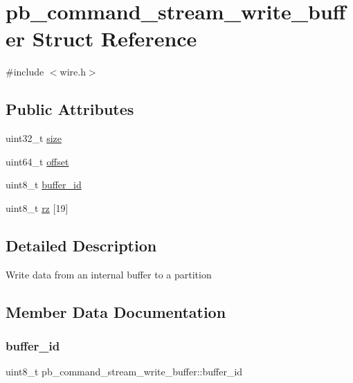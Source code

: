 \hypertarget{structpb__command__stream__write__buffer}{}\section{pb\+\_\+command\+\_\+stream\+\_\+write\+\_\+buffer Struct Reference}
\label{structpb__command__stream__write__buffer}


{\ttfamily \#include $<$wire.\+h$>$}

\subsection*{Public Attributes}
\begin{DoxyCompactItemize}
\item 
uint32\+\_\+t \hyperlink{structpb__command__stream__write__buffer_acb91696c62fe1c32809a8f6480098f09}{size}
\item 
uint64\+\_\+t \hyperlink{structpb__command__stream__write__buffer_ae9e39d7400d9e4115bac8dac48c6e8ad}{offset}
\item 
uint8\+\_\+t \hyperlink{structpb__command__stream__write__buffer_a6dd25bf25a7d43a4caa4e19027fb9592}{buffer\+\_\+id}
\item 
uint8\+\_\+t \hyperlink{structpb__command__stream__write__buffer_abbbd45ad43e4731565c0cb6d8e5eeed7}{rz} \mbox{[}19\mbox{]}
\end{DoxyCompactItemize}


\subsection{Detailed Description}
Write data from an internal buffer to a partition 

\subsection{Member Data Documentation}
\mbox{\label{structpb__command__stream__write__buffer_a6dd25bf25a7d43a4caa4e19027fb9592}} 
\subsubsection{\texorpdfstring{buffer\+\_\+id}{buffer\_id}}
{\footnotesize\ttfamily uint8\+\_\+t pb\+\_\+command\+\_\+stream\+\_\+write\+\_\+buffer\+::buffer\+\_\+id}

